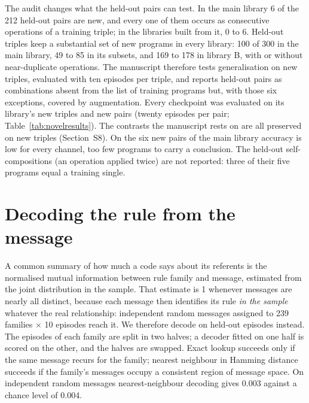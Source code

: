 \documentclass[11pt]{article}
\begin{document}
The audit changes what the held-out pairs can test. In the main library 6 of the 212 held-out pairs are new,
and every one of them occurs as consecutive operations of a training triple; in the libraries built from it, 0 to
6. Held-out triples keep a substantial set of new programs in every library: 100 of 300 in the main library, 49 to 85 in its
subsets, and 169 to 178 in library B, with or without near-duplicate operations. The manuscript therefore tests generalisation on new triples, evaluated
with ten episodes per triple, and reports held-out pairs as combinations absent from the list of training programs
but, with those six exceptions, covered by augmentation. Every checkpoint was evaluated on its library's new
triples and new pairs (twenty episodes per pair; Table~\ref{tab:novelresults}). The contrasts the manuscript
rests on are all preserved on new triples (Section~S8). On the six new pairs of the main library accuracy is
low for every channel, too few programs to carry a conclusion. The
held-out self-compositions (an operation applied twice) are not reported: three of their five programs equal a
training single.

\begin{table}[h]\centering\small\resizebox{\textwidth}{!}{}
\caption{Exact match (\%) on all held-out programs and on the new ones, mean $\pm$ s.e.m. over runs (a single
value where there is one run). For the smaller libraries, staged / joint.}\label{tab:novelresults}
\end{table}

\section{Decoding the rule from the message}\label{s:decoding}
A common summary of how much a code says about its referents is the normalised mutual information between rule
family and message, estimated from the joint distribution in the sample. That estimate is 1 whenever messages are
nearly all distinct, because each message then identifies its rule \emph{in the sample} whatever the real
relationship: independent random messages assigned to 239 families $\times$ 10 episodes reach it. We therefore
decode on held-out episodes instead. The episodes of each family are split in two halves; a decoder
fitted on one half is scored on the other, and the halves are swapped. Exact lookup succeeds only if the
same message recurs for the family; nearest neighbour in Hamming distance succeeds if the family's messages
occupy a consistent region of message space. On independent random messages nearest-neighbour decoding
gives 0.003 against a chance level of 0.004.
\end{document}
